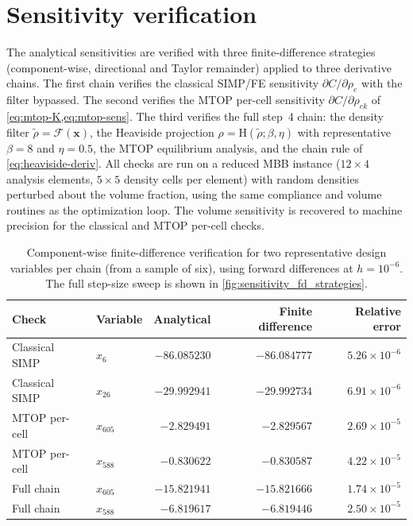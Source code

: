 \documentclass[11pt,a4paper]{article}
\begin{document}
\section{Sensitivity verification}\label{sec:sensverif}

The analytical sensitivities are verified with three finite-difference strategies (component-wise, directional and Taylor remainder) applied to three derivative chains. The first chain verifies the classical SIMP/FE sensitivity $\partial C/\partial \rho_{e}$ with the filter bypassed. The second verifies the MTOP per-cell sensitivity $\partial C/\partial \rho_{ek}$ of \cref{eq:mtop-K,eq:mtop-sens}. The third verifies the full step~4 chain: the density filter $\widetilde{\rho}=\mathcal{F}(\boldsymbol{x})$, the Heaviside projection $\rho=\mathrm{H}(\widetilde{\rho};\beta,\eta)$ with representative $\beta=8$ and $\eta=0.5$, the MTOP equilibrium analysis, and the chain rule of \cref{eq:heaviside-deriv}. All checks are run on a reduced MBB instance ($12\times 4$ analysis elements, $5\times 5$ density cells per element) with random densities perturbed about the volume fraction, using the same compliance and volume routines as the optimization loop. The volume sensitivity is recovered to machine precision for the classical and MTOP per-cell checks.

\begin{table}[htbp]
  \centering
  \caption{Component-wise finite-difference verification for two representative design variables per chain (from a sample of six), using forward differences at $h=10^{-6}$. The full step-size sweep is shown in \cref{fig:sensitivity_fd_strategies}.}
  \label{tab:sensitivity-component}
  \begin{tabular}{llrrr}
    \toprule
    Check & Variable & Analytical & Finite difference & Relative error \\
    \midrule
    Classical SIMP & $x_{6}$ & $-86.085230$ & $-86.084777$ & $5.26\times 10^{-6}$ \\
    Classical SIMP & $x_{26}$ & $-29.992941$ & $-29.992734$ & $6.91\times 10^{-6}$ \\
    MTOP per-cell & $x_{605}$ & $-2.829491$ & $-2.829567$ & $2.69\times 10^{-5}$ \\
    MTOP per-cell & $x_{588}$ & $-0.830622$ & $-0.830587$ & $4.22\times 10^{-5}$ \\
    Full chain & $x_{605}$ & $-15.821941$ & $-15.821666$ & $1.74\times 10^{-5}$ \\
    Full chain & $x_{588}$ & $-6.819617$ & $-6.819446$ & $2.50\times 10^{-5}$ \\
    \bottomrule
  \end{tabular}
\end{table}
\end{document}
